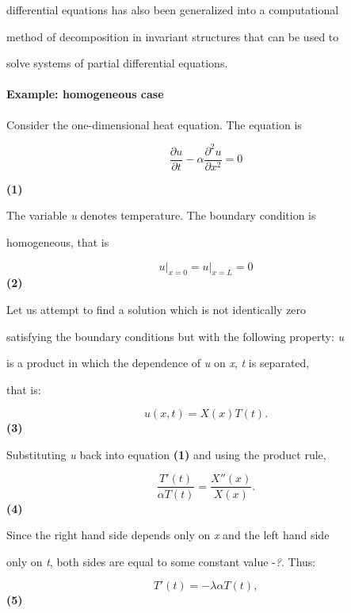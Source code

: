 differential equations has also been generalized into a computational

method of decomposition in invariant structures that can be used to

solve systems of partial differential equations.



\paragraph{Example: homogeneous case}



Consider the one-dimensional heat equation. The equation is



$$\frac{\partial u}{\partial t} - \alpha\frac{\partial^{2}u}{\partial x^{2}} = 0$$

\textbf{(1)}



The variable \textit{u} denotes temperature. The boundary condition is

homogeneous, that is



$$u\big|_{x=0}=u\big|_{x=L}=0$$ \textbf{(2)}



Let us attempt to find a solution which is not identically zero

satisfying the boundary conditions but with the following property: \textit{u}

is a product in which the dependence of \textit{u} on \textit{x}, \textit{t} is separated,

that is:



$$u(x,t) = X(x) T(t).$$ \textbf{(3)}



Substituting \textit{u} back into equation \textbf{(1)} and using the product rule,



$$\frac{T'(t)}{\alpha T(t)} = \frac{X''(x)}{X(x)}.$$ \textbf{(4)}



Since the right hand side depends only on \textit{x} and the left hand side

only on \textit{t}, both sides are equal to some constant value -\textit{?}. Thus:



$$T'(t) = - \lambda \alpha T(t),$$ \textbf{(5)}



